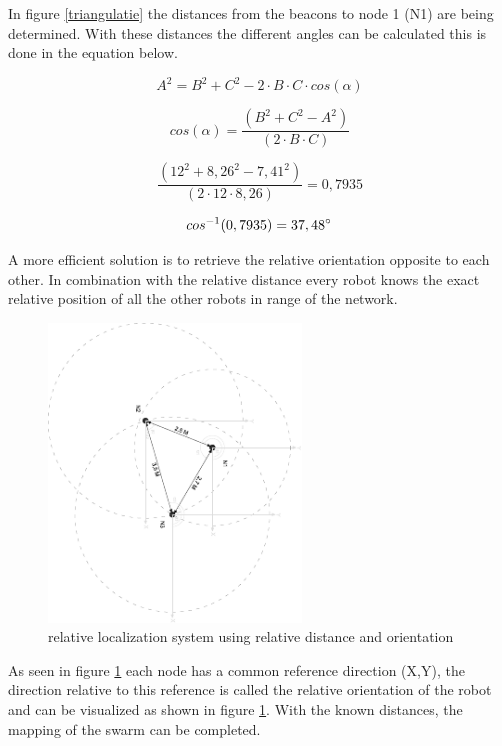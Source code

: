 \documentclass[10pt,a4paper]{article}
\begin{document}
In figure \ref{triangulatie} the distances from the beacons to node 1 (N1) are being determined. With these distances the different angles can be calculated this is done in the equation below.

\begin{equation}
A^2 = B^2 + C^2 - 2\cdot B\cdot C\cdot cos(\alpha)
\end{equation}

\begin{equation}
\label{eq:hoek}
cos(\alpha) = \frac{(B^2 + C^2 - A^2)}{(2\cdot B\cdot C)}
\end{equation}

\begin{equation}
\label{eq:hoek}
\frac{(12^2 + 8,26^2 - 7,41^2)}{(2\cdot12\cdot8,26)} = 0,7935
\end{equation}

\begin{equation}
cos^{-1}(0,7935) = 37,48\degree
\end{equation}

A more efficient solution is to retrieve the relative orientation opposite to each other. In combination with the relative distance every robot knows the exact relative position of all the other robots in range of the network.

\begin{figure}[H]
\centering
\includegraphics[angle=90, width=0.6\textwidth]{orientation.pdf}
\caption{relative localization system using relative distance and orientation}
\label{orientation}
\end{figure}

As seen in figure \ref{orientation} each node has a common reference direction (X,Y), the direction relative to this reference is called the relative orientation of the robot and can be visualized as shown in figure \ref{orientation}. With the known distances, the mapping of the swarm can be completed.
\newpage
\end{document}
